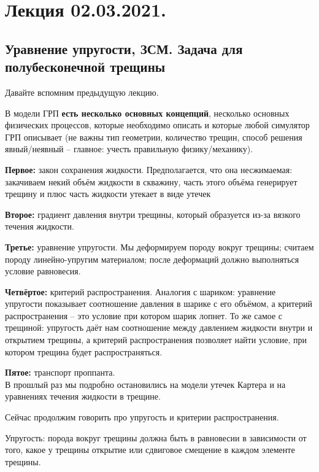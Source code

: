 \documentclass[main.tex]{subfiles}
\begin{document}

\section{Лекция 02.03.2021.}

\subsection{Уравнение упругости, ЗСМ. Задача для полубесконечной трещины}

Давайте вспомним предыдущую лекцию.

В модели ГРП \textbf{есть несколько основных концепций}, несколько основных физических процессов, которые необходимо описать и которые любой симулятор ГРП описывает (не важны тип геометрии, количество трещин, способ решения явный/неявный -- главное: учесть правильную физику/механику).

\textbf{Первое:} закон сохранения жидкости.
Предполагается, что она несжимаемая: закачиваем некий объём жидкости в скважину, часть этого объёма генерирует трещину и плюс часть жидкости утекает в виде утечек

\textbf{Второе:} градиент давления внутри трещины, который образуется из-за вязкого течения жидкости.

\textbf{Третье:} уравнение упругости.
Мы деформируем породу вокруг трещины; считаем породу линейно-упругим материалом; после деформаций должно выполняться условие равновесия.

\textbf{Четвёртое:} критерий распространения.
Аналогия с шариком: уравнение упругости показывает соотношение давления в шарике с его объёмом, а критерий распространения -- это условие при котором шарик лопнет.
То же самое с трещиной: упругость даёт нам соотношение между давлением жидкости внутри и открытием трещины, а критерий распространения позволяет найти условие, при котором трещина будет распространяться.

\textbf{Пятое:} транспорт проппанта.
\\

В прошлый раз мы подробно остановились на модели утечек Картера и на уравнениях течения жидкости в трещине.

Сейчас продолжим говорить про упругость и критерии распространения.

Упругость: порода вокруг трещины должна быть в равновесии в зависимости от того, какое у трещины открытие или сдвиговое смещение в каждом элементе трещины.
\end{document}
